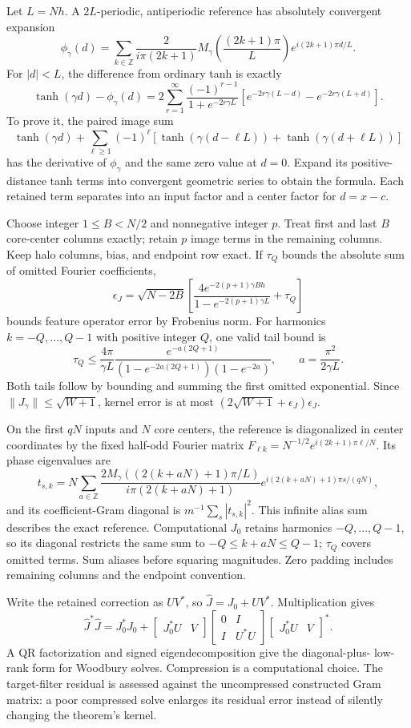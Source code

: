 \documentclass[11pt]{article}
\theoremstyle{definition}
\begin{document}
Let $L=Nh$. A $2L$-periodic, antiperiodic reference has absolutely
convergent expansion
\[
\phi_\gamma(d)=\sum_{k\in\mathbb Z}
\frac2{i\pi(2k+1)}M_\gamma\!\left(\frac{(2k+1)\pi}{L}\right)
e^{i(2k+1)\pi d/L}.
\]
For $|d|<L$, the difference from ordinary tanh is exactly
\[
\tanh(\gamma d)-\phi_\gamma(d)=
2\sum_{r=1}^\infty\frac{(-1)^{r-1}}{1+e^{-2r\gamma L}}
\left[e^{-2r\gamma(L-d)}-e^{-2r\gamma(L+d)}\right].
\]
To prove it, the paired image sum
\[
\tanh(\gamma d)+\sum_{\ell\ge1}(-1)^\ell
[\tanh(\gamma(d-\ell L))+\tanh(\gamma(d+\ell L))]
\]
has the derivative of $\phi_\gamma$ and the same zero value at $d=0$.
Expand its positive-distance tanh terms into convergent geometric series
to obtain the formula. Each retained term separates into an input factor
and a center factor for $d=x-c$.

Choose integer $1\le B<N/2$ and nonnegative integer $p$. Treat first
and last $B$ core-center columns exactly; retain $p$ image terms in the
remaining columns. Keep halo columns, bias, and endpoint row exact.
If $\tau_Q$ bounds the absolute sum of omitted Fourier coefficients,
\[
\epsilon_J=\sqrt{N-2B}\left[
\frac{4e^{-2(p+1)\gamma Bh}}{1-e^{-2(p+1)\gamma L}}+\tau_Q\right]
\]
bounds feature operator error by Frobenius norm. For harmonics
$k=-Q,\ldots,Q-1$ with positive integer $Q$, one valid tail bound is
\[
\tau_Q\le\frac{4\pi}{\gamma L}
\frac{e^{-a(2Q+1)}}{(1-e^{-2a(2Q+1)})(1-e^{-2a})},
\qquad a=\frac{\pi^2}{2\gamma L}.
\]
Both tails follow by bounding and summing the first omitted exponential.
Since $\|J_\gamma\|\le\sqrt{W+1}$, kernel error is at most
$(2\sqrt{W+1}+\epsilon_J)\epsilon_J$.

On the first $qN$ inputs and $N$ core centers, the reference is
diagonalized in center coordinates by the fixed half-odd Fourier matrix
$F_{\ell k}=N^{-1/2}e^{i(2k+1)\pi\ell/N}$. Its phase eigenvalues are
\[
t_{s,k}=N\sum_{a\in\mathbb Z}
\frac{2M_\gamma((2(k+aN)+1)\pi/L)}{i\pi(2(k+aN)+1)}
e^{i(2(k+aN)+1)\pi s/(qN)},
\]
and its coefficient-Gram diagonal is $m^{-1}\sum_s|t_{s,k}|^2$.
This infinite alias sum describes the exact reference. Computational $J_0$
retains harmonics $-Q,\ldots,Q-1$, so its diagonal restricts the same sum to
$-Q\le k+aN\le Q-1$; $\tau_Q$ covers omitted terms.
Sum aliases before squaring magnitudes. Zero padding includes remaining
columns and the endpoint convention.

Write the retained correction as $UV^*$, so $\widehat J=J_0+UV^*$.
Multiplication gives
\[
\widehat J^*\widehat J=J_0^*J_0+
\begin{bmatrix}J_0^*U&V\end{bmatrix}
\begin{bmatrix}0&I\\I&U^*U\end{bmatrix}
\begin{bmatrix}J_0^*U&V\end{bmatrix}^*.
\]
A QR factorization and signed eigendecomposition give the diagonal-plus-
low-rank form for Woodbury solves. Compression is a computational choice.
The target-filter residual is assessed against the uncompressed constructed
Gram matrix: a poor compressed solve enlarges its residual error instead
of silently changing the theorem's kernel.
\end{document}
